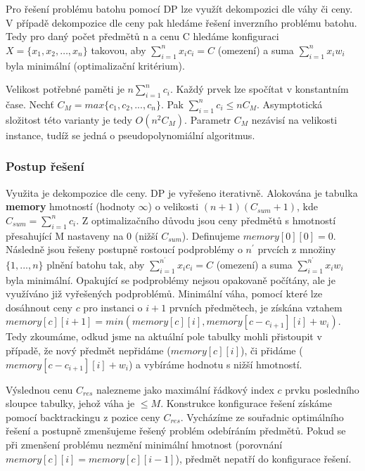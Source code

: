 \documentclass[12pt]{article}
\begin{document}
Pro řešení problému batohu pomocí DP lze využít dekompozici dle váhy či ceny. V případě dekompozice dle ceny pak hledáme řešení inverzního problému batohu. Tedy pro daný počet předmětů n a cenu C hledáme konfiguraci \( X=\{x_1,x_2,…,x_n\} \) takovou, aby \( \sum_{i=1}^{n} x_ic_i = C \) (omezení) a suma \( \sum_{i=1}^{n} x_iw_i \) byla minimální (optimalizační kritérium).

Velikost potřebné paměti je \(n \sum_{i=1}^{n}c_i\). Každý prvek lze spočítat v konstantním čase. Nechť \(C_M = max\{c_1, c_2, ..., c_n\}\). Pak \(\sum_{i=1}^{n}c_i \leq n C_M\). Asymptotická složitost této varianty je tedy \( O(n^2 C_M) \). Parametr $C_M$ nezávisí na velikosti instance, tudíž se jedná o pseudopolynomiální algoritmus.

\subsubsection{Postup řešení}

Využita je dekompozice dle ceny. DP je vyřešeno iterativně. Alokována je tabulka \textbf{memory} hmotností (hodnoty $\infty$) o velikosti $(n+1)(C_{sum}+1)$, kde $C_{sum}=\sum_{i=1}^{n}c_{i}$. Z optimalizačního důvodu jsou ceny předmětů s hmotností přesahující M nastaveny na 0 (nižší $C_{sum}$). Definujeme $memory[0][0]=0$. Následně jsou řešeny postupně rostoucí podproblémy o $n^{'}$ prvcích z množiny $\{1,...,n\}$ plnění batohu tak, aby $\sum_{i=1}^{n^{'}} x_ic_i = C$ (omezení) a suma $\sum_{i=1}^{n^{'}} x_iw_i$ byla minimální. Opakující se podproblémy nejsou opakovaně počítány, ale je využíváno již vyřešených podproblémů. Minimální váha, pomocí které lze dosáhnout ceny $c$ pro instanci o $i+1$ prvních předmětech, je získána vztahem $memory[c][i+1] = min(memory[c][i], memory[c-c_{i+1}][i] + w_{i})$. Tedy zkoumáme, odkud jsme na aktuální pole tabulky mohli přistoupit v případě, že nový předmět nepřidáme ($memory[c][i]$), či přidáme ($memory[c-c_{i+1}][i] + w_{i}$) a vybíráme hodnotu s nižší hmotností.

Výslednou cenu $C_{res}$ nalezneme jako maximální řádkový index $c$ prvku posledního sloupce tabulky, jehož váha je $\leq M$. Konstrukce konfigurace řešení získáme pomocí backtrackingu z pozice ceny $C_{res}$. Vycházíme ze souřadnic optimálního řešení a postupně zmenšujeme řešený problém odebíráním předmětů. Pokud se při zmenšení problému nezmění minimální hmotnost (porovnání $memory[c][i] = memory[c][i-1]$), předmět nepatří do konfigurace řešení.

\newpage
\end{document}
